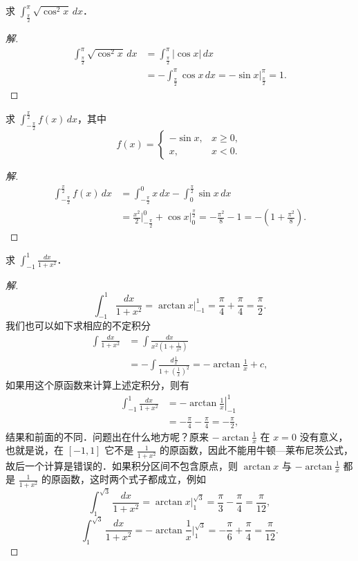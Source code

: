 \begin{example}
求 $\displaystyle \int_{\frac{\pi}{2}}^\pi \sqrt{\cos^2 x}\,dx$．
\end{example}

\begin{proof}[解]
\begin{align*}
\int_{\frac{\pi}{2}}^\pi \sqrt{\cos^2 x}\,dx &= \int_{\frac{\pi}{2}}^\pi |\cos x|\,dx \\
&= -\int_{\frac{\pi}{2}}^\pi \cos x\,dx = -\sin x\bigg|_{\frac{\pi}{2}}^\pi = 1.
\end{align*}
\end{proof}

\begin{example}
求 $\displaystyle \int_{-\frac{\pi}{2}}^{\frac{\pi}{2}} f(x)\,dx$，其中
\[
f(x) = \begin{cases}
-\sin x, & x \geqslant 0, \\
x, & x < 0.
\end{cases}
\]
\end{example}

\begin{proof}[解]
\begin{align*}
\int_{-\frac{\pi}{2}}^{\frac{\pi}{2}}f(x)\,dx &= \int_{-\frac{\pi}{2}}^0 x\,dx - \int_0^{\frac{\pi}{2}}\sin x\,dx \\
&= \frac{x^2}{2}\bigg|_{-\frac{\pi}{2}}^0 + \cos x\bigg|_0^{\frac{\pi}{2}} = -\frac{\pi^2}{8} - 1 = -\left(1 + \frac{\pi^2}{8}\right).
\end{align*}
\end{proof}

\begin{example}
求 $\displaystyle \int_{-1}^1 \frac{dx}{1 + x^2}$．
\end{example}

\begin{proof}[解]
\[
\int_{-1}^1 \frac{dx}{1 + x^2} = \arctan x\bigg|_{-1}^1 = \frac{\pi}{4} + \frac{\pi}{4} = \frac{\pi}{2}.
\]
我们也可以如下求相应的不定积分
\begin{align*}
\int \frac{dx}{1 + x^2} &= \int \frac{dx}{x^2\left(1 + \frac{1}{x^2}\right)} \\
&= -\int \frac{d\frac{1}{x}}{1 + \left(\frac{1}{x}\right)^2} = -\arctan\frac{1}{x} + c,
\end{align*}
如果用这个原函数来计算上述定积分，则有
\begin{align*}
\int_{-1}^1 \frac{dx}{1 + x^2} &= -\left.\arctan\frac{1}{x}\right|_{-1}^1 \\
&= -\frac{\pi}{4} - \frac{\pi}{4} = -\frac{\pi}{2},
\end{align*}
结果和前面的不同．问题出在什么地方呢？原来 $-\arctan\frac{1}{x}$ 在 $x = 0$ 没有意义，也就是说，在 $[-1,1]$ 它不是 $\frac{1}{1 + x^2}$ 的原函数，因此不能用牛顿---莱布尼茨公式，故后一个计算是错误的．如果积分区间不包含原点，则 $\arctan x$ 与 $-\arctan\frac{1}{x}$ 都是 $\frac{1}{1 + x^2}$ 的原函数，这时两个式子都成立，例如
\[
\int_1^{\sqrt{3}}\frac{dx}{1 + x^2} = \arctan x\bigg|_1^{\sqrt{3}} = \frac{\pi}{3} - \frac{\pi}{4} = \frac{\pi}{12},
\]
\[
\int_1^{\sqrt{3}}\frac{dx}{1 + x^2} = -\arctan\frac{1}{x}\bigg|_1^{\sqrt{3}} = -\frac{\pi}{6} + \frac{\pi}{4} = \frac{\pi}{12}.
\]
\end{proof}

